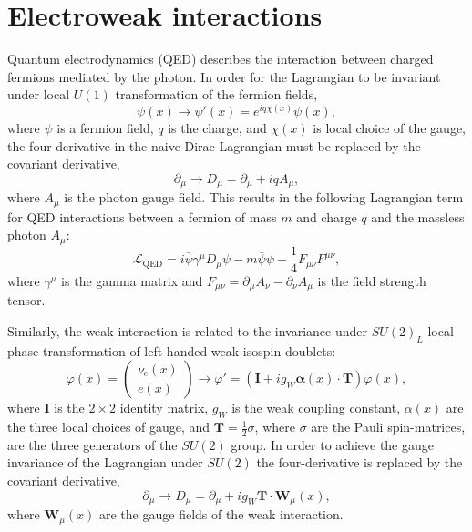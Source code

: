 \section{Electroweak interactions}

Quantum electrodynamics (QED) describes the interaction between charged fermions
mediated by the photon. In order for the Lagrangian to be invariant
under local $U(1)$ transformation of the fermion fields,
\begin{equation}
\psi(x) \rightarrow \psi'(x) = e^{iq\chi(x)}\psi(x),
\end{equation}
where $\psi$ is a fermion field, $q$ is the charge, and $\chi(x)$ is local choice of
the gauge, the four derivative in the naive Dirac Lagrangian must be replaced by
the covariant derivative,
\begin{equation}
\partial_\mu \rightarrow D_\mu = \partial_\mu + i q A_\mu,
\end{equation}
where $A_\mu$ is the photon gauge field. This results in the following Lagrangian term for
QED interactions between a fermion of mass $m$ and charge $q$ and the massless photon $A_\mu$:
\begin{equation}
\mathcal{L}_{\text{QED}} =
i\bar{\psi}\gamma^\mu D_\mu \psi - m\bar\psi\psi - \frac{1}{4}F_{\mu\nu}F^{\mu\nu},
\end{equation}
where $\gamma^\mu$ is the gamma matrix and $F_{\mu\nu} = \partial_\mu A_\nu - \partial_\nu A_\mu$
is the field strength tensor.

Similarly, the weak interaction is related to the invariance under $SU(2)_L$ local
phase transformation of left-handed weak isospin doublets:
\begin{equation}
\varphi(x) = \begin{pmatrix} \nu_e(x) \\ e(x) \end{pmatrix} \rightarrow
\varphi' = (\mathbf{I} + i g_W \mathbf{\alpha}(x)\cdot\mathbf{T}) \varphi(x),
\end{equation}
where $\mathbf{I}$ is the $2\times2$ identity matrix, $g_W$ is the weak coupling constant,
$\alpha(x)$ are the three local choices of gauge, and $\mathbf{T} = \frac{1}{2}\sigma$,
where $\sigma$ are the Pauli spin-matrices, are the three generators of the $SU(2)$ group.
In order to achieve the gauge invariance of the Lagrangian under $SU(2)$ the four-derivative
is replaced by the covariant derivative,
\begin{equation}
\partial_\mu \rightarrow D_\mu = \partial_\mu + i g_W \mathbf{T} \cdot \mathbf{W}_\mu(x),
\end{equation}
where $\mathbf{W}_\mu(x)$ are the gauge fields of the weak interaction.

